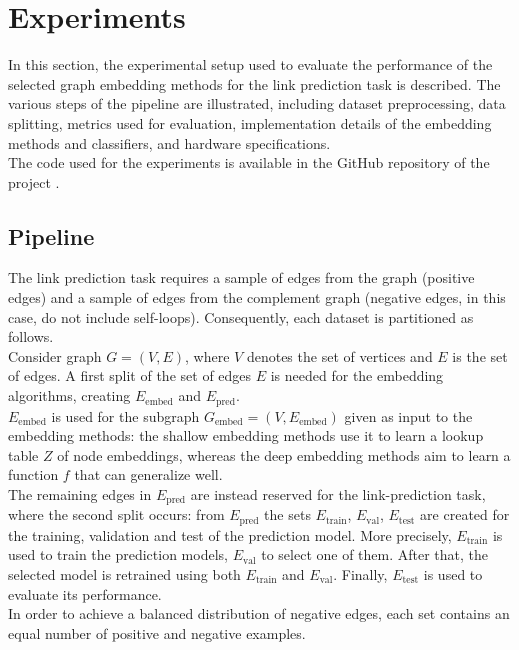 \section{Experiments}
In this section, the experimental setup used to evaluate the performance of the selected graph embedding methods for the link prediction task is described.
The various steps of the pipeline are illustrated, including dataset preprocessing, data splitting, metrics used for evaluation, implementation details of the embedding methods and classifiers, and hardware specifications.
\\
The code used for the experiments is available in the GitHub repository of the project \cite{ProjectRepo}.

\subsection{Pipeline}
The link prediction task requires a sample of edges from the graph (positive edges) and a sample of edges from the complement graph (negative edges, in this case, do not include self-loops). 
Consequently, each dataset is partitioned as follows.
\\
Consider graph $G=(V, E)$, where $V$ denotes the set of vertices and $E$ is the set of edges.
A first split of the set of edges $E$ is needed for the embedding algorithms, creating $E_{\text{embed}}$ and $E_{\text{pred}}$.
\\
$E_{\text{embed}}$ is used for the subgraph $G_{\text{embed}}=(V, E_{\text{embed}})$ given as input to the embedding methods:
the shallow embedding methods use it to learn a lookup table $Z$ of node embeddings, whereas the deep embedding methods aim to learn a function $f$ that can generalize well. 
\\
The remaining edges in $E_{\text{pred}}$ are instead reserved for the link-prediction task, where the second split occurs:
from $E_{\text{pred}}$ the sets $E_{\text{train}}$, $E_{\text{val}}$, $E_{\text{test}}$ are created for the training, validation and test of the prediction model. 
More precisely, $E_{\text{train}}$ is used to train the prediction models, $E_{\text{val}}$ to select one of them. 
After that, the selected model is retrained using both $E_{\text{train}}$ and $E_{\text{val}}$.
Finally, $E_{\text{test}}$ is used to evaluate its performance.
\\\newline
In order to achieve a balanced distribution of negative edges, each set contains an equal number of positive and negative examples. 

